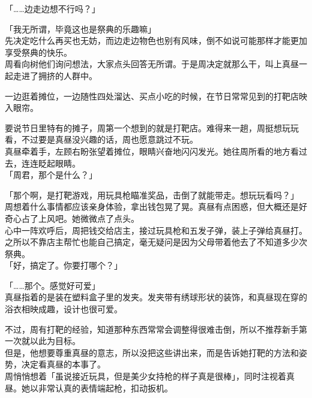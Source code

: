 「……边走边想不行吗？」

「我无所谓，毕竟这也是祭典的乐趣嘛」\\

先决定吃什么再买也无妨，而边走边物色也别有风味，倒不如说可能那样才能更加享受祭典的快乐。\\

周看向树他们询问想法，大家点头回答无所谓。于是周决定就那么干，叫上真昼一起走进了拥挤的人群中。\\

\vspace{2\baselineskip}

一边逛着摊位，一边随性四处溜达、买点小吃的时候，在节日常常见到的打靶店映入眼帘。

要说节日里特有的摊子，周第一个想到的就是打靶店。难得来一趟，周挺想玩玩看，不过要是真昼没兴趣的话，周也愿意跳过不玩。\\

真昼牵着手，左顾右盼张望着摊位，眼睛兴奋地闪闪发光。她往周所看的地方看过去，连连眨起眼睛。\\

「周君，那个是什么？」

「那个啊，是打靶游戏，用玩具枪瞄准奖品，击倒了就能带走。想玩玩看吗？」\\

周想着什么事情都应该亲身体验，拿出钱包晃了晃。真昼有点困惑，但大概还是好奇心占了上风吧。她微微点了点头。\\

心中一阵欢呼后，周把钱交给店主，接过玩具枪和五发子弹，装上子弹给真昼打。之所以不靠店主帮忙也能自己搞定，毫无疑问是因为父母带着他去了不知道多少次祭典。\\

「好，搞定了。你要打哪个？」

「……那个。感觉好可爱」\\

真昼指着的是装在塑料盒子里的发夹。发夹带有绣球形状的装饰，和真昼现在穿的浴衣相映成趣，设计也很可爱。

不过，周有打靶的经验，知道那种东西常常会调整得很难击倒，所以不推荐新手第一次就以此为目标。\\

但是，他想要尊重真昼的意志，所以没把这些讲出来，而是告诉她打靶的方法和姿势，决定看真昼的本事了。\\

周悄悄想着「虽说接近玩具，但是美少女持枪的样子真是很棒」，同时注视着真昼。她以非常认真的表情端起枪，扣动扳机。\\

